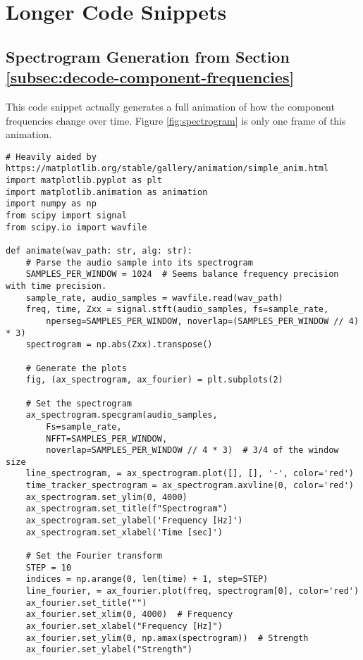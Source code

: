 
\chapter{Longer Code Snippets} %
\label{appendix:code} %

\section{Spectrogram Generation from Section \ref{subsec:decode-component-frequencies}}
This code snippet actually generates a full animation of how the component frequencies change over time. Figure \ref{fig:spectrogram} is only one frame of this animation.
\begin{verbatim}
# Heavily aided by https://matplotlib.org/stable/gallery/animation/simple_anim.html
import matplotlib.pyplot as plt
import matplotlib.animation as animation
import numpy as np
from scipy import signal
from scipy.io import wavfile

def animate(wav_path: str, alg: str):
    # Parse the audio sample into its spectrogram
    SAMPLES_PER_WINDOW = 1024  # Seems balance frequency precision with time precision.
    sample_rate, audio_samples = wavfile.read(wav_path)
    freq, time, Zxx = signal.stft(audio_samples, fs=sample_rate,
        nperseg=SAMPLES_PER_WINDOW, noverlap=(SAMPLES_PER_WINDOW // 4) * 3)
    spectrogram = np.abs(Zxx).transpose()

    # Generate the plots
    fig, (ax_spectrogram, ax_fourier) = plt.subplots(2)

    # Set the spectrogram
    ax_spectrogram.specgram(audio_samples,
        Fs=sample_rate, 
        NFFT=SAMPLES_PER_WINDOW, 
        noverlap=SAMPLES_PER_WINDOW // 4 * 3)  # 3/4 of the window size
    line_spectrogram, = ax_spectrogram.plot([], [], '-', color='red')
    time_tracker_spectrogram = ax_spectrogram.axvline(0, color='red')
    ax_spectrogram.set_ylim(0, 4000)
    ax_spectrogram.set_title(f"Spectrogram")
    ax_spectrogram.set_ylabel('Frequency [Hz]')
    ax_spectrogram.set_xlabel('Time [sec]')

    # Set the Fourier transform
    STEP = 10
    indices = np.arange(0, len(time) + 1, step=STEP)
    line_fourier, = ax_fourier.plot(freq, spectrogram[0], color='red')
    ax_fourier.set_title("")
    ax_fourier.set_xlim(0, 4000)  # Frequency
    ax_fourier.set_xlabel("Frequency [Hz]")
    ax_fourier.set_ylim(0, np.amax(spectrogram))  # Strength
    ax_fourier.set_ylabel("Strength")


\end{verbatim}
